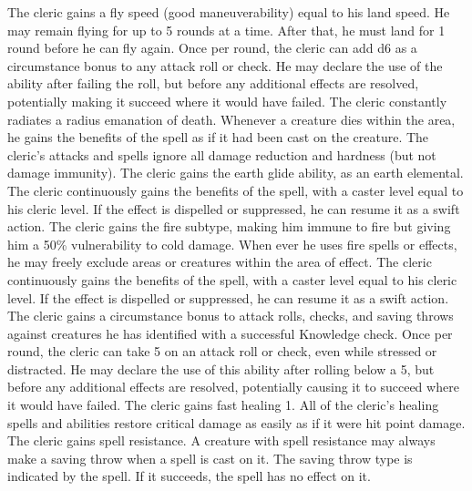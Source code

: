  The cleric gains a fly speed (good maneuverability) equal to his land speed. He may remain flying for up to 5 rounds at a time. After that, he must land for 1 round before he can fly again.
 Once per round, the cleric can add d6 as a circumstance bonus to any attack roll or check. He may declare the use of the ability after failing the roll, but before any additional effects are resolved, potentially making it succeed where it would have failed.
 The cleric constantly radiates a \areamed radius emanation of death. Whenever a creature dies within the area, he gains the benefits of the  spell as if it had been cast on the creature.
 The cleric's attacks and spells ignore all damage reduction and hardness (but not damage immunity).
 The cleric gains the earth glide ability, as an earth elemental.
 The cleric continuously gains the benefits of the  spell, with a caster level equal to his cleric level. If the effect is dispelled or suppressed, he can resume it as a swift action.
 The cleric gains the fire subtype, making him immune to fire but giving him a 50\% vulnerability to cold damage. When ever he uses fire spells or effects, he may freely exclude areas or creatures within the area of effect.
 The cleric continuously gains the benefits of the  spell, with a caster level equal to his cleric level. If the effect is dispelled or suppressed, he can resume it as a swift action.
 The cleric gains a  circumstance bonus to attack rolls, checks, and saving throws against creatures he has identified with a successful Knowledge check.
 Once per round, the cleric can take 5 on an attack roll or check, even while stressed or distracted. He may declare the use of this ability after rolling below a 5, but before any additional effects are resolved, potentially causing it to succeed where it would have failed.
 The cleric gains fast healing 1. All of the cleric's healing spells and abilities restore critical damage as easily as if it were hit point damage.
 The cleric gains spell resistance. A creature with spell resistance may always make a saving throw when a spell is cast on it. The saving throw type is indicated by the spell. If it succeeds, the spell has no effect on it.
